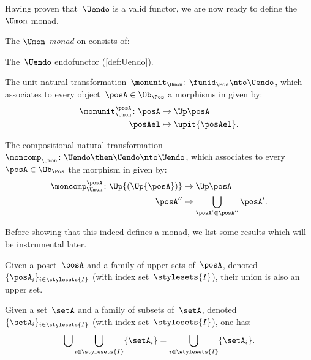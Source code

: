 Having proven that~$\Uendo$ is a valid functor, we are now ready to define the~$\Umon$ monad.
\begin{definition}
  \label{def:Umon}
  The \emph{$\Umon$ monad} on \Pos consists of:
  \begin{compactenum}
    \item The~$\Uendo$ endofunctor (\cref{def:Uendo}).
    \item The unit natural transformation~$\monunit_{\Umon} \colon \funid_{\Pos}\nto \Uendo$, which associates to every object~$\posA \in \Ob_\Pos$ a morphisms in \Pos given by:
    \begin{equation}
      \begin{aligned}
        \monunit_{\Umon}^\posA\colon \posA &\to \Up \posA\\
        \posAel&\mapsto \upit \{\posAel\}.
      \end{aligned}
    \end{equation}
    \item The compositional natural transformation~$\moncomp_{\Umon}\colon \Uendo\then \Uendo\nto \Uendo$, which associates to every~$\posA\in \Ob_\Pos$ the morphism in \Pos given by:
    \begin{equation}
      \begin{aligned}
        \moncomp_{\Umon}^\posA\colon \Up{(\Up{\posA})}&\to \Up \posA\\
        \posA''&\mapsto \bigcup_{\posA'\in \posA''}\posA'.
      \end{aligned}
    \end{equation}
  \end{compactenum}
\end{definition}

Before showing that this indeed defines a monad, we list some results which will be instrumental later.
\begin{lemma}
  \label{lem:upperunionupper}
  Given a poset~$\posA$ and a family of upper sets of~$\posA$, denoted~$\{\posA_i\}_{i\in \stylesets{I}}$ (with index set~$\stylesets{I}$), their union is also an upper set.
\end{lemma}

\begin{lemma}
  \label{lem:setunionset}
  Given a set~$\setA$ and a family of subsets of~$\setA$, denoted~$\{\setA_i\}_{i\in \stylesets{I}}$ (with index set~$\stylesets{I}$), one has:
  \begin{equation}
    \bigcup \bigcup_{i\in \stylesets{I}}\{\setA_i\} = \bigcup_{i\in \stylesets{I}}\{\setA_i\}.
  \end{equation}
\end{lemma}


